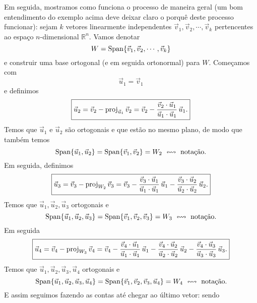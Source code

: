 \documentclass[../livro.tex]{subfiles}  %
\begin{document}
Em seguida, mostramos como funciona o processo de maneira geral (um bom entendimento do exemplo acima deve deixar claro o porquê deste processo funcionar): sejam $k$ vetores linearmente independentes $\vec{v}_1, \vec{v}_2, \cdots, \vec{v}_k$ pertencentes ao espaço $n$-dimensional $\mathbb{R}^n$. Vamos denotar
\begin{equation}
W = \operatorname{Span} \{\vec{v}_1, \vec{v}_2, \cdots, \vec{v}_k\}
\end{equation} e construir uma base ortogonal (e em seguida ortonormal) para $W$. Começamos com
\begin{equation}
\boxed{\vec{u}_1 = \vec{v}_1}
\end{equation} e definimos
\begin{equation}
\boxed{\vec{u}_2 = \vec{v}_2 - \operatorname{proj}_{\vec{u}_1} \vec{v}_2 = \vec{v}_2 - \frac{\vec{v}_2 \cdot \vec{u}_1}{\vec{u}_1 \cdot \vec{u}_1} \, \vec{u}_1.}
\end{equation} Temos que $\vec{u}_1$ e $\vec{u}_2$ são ortogonais e que estão no mesmo plano, de modo que também temos
\begin{equation}
\operatorname{Span} \{ \vec{u}_1, \vec{u}_2 \} = \operatorname{Span} \{ \vec{v}_1, \vec{v}_2 \} = W_2 \ \leftrightsquigarrow \text{ notação.}
\end{equation} Em seguida, definimos
\begin{equation}
\boxed{\vec{u}_3 = \vec{v}_3 - \operatorname{proj}_{W_2} \vec{v}_3 = \vec{v}_3 - \frac{\vec{v}_3 \cdot \vec{u}_1}{\vec{u}_1 \cdot \vec{u}_1} \, \vec{u}_1 - \frac{\vec{v}_3 \cdot \vec{u}_2}{\vec{u}_2 \cdot \vec{u}_2} \, \vec{u}_2.}
\end{equation} Temos que $\vec{u}_1, \vec{u}_2, \vec{u}_3$ ortogonais e
\begin{equation}
\Span \{ \vec{u}_1, \vec{u}_2, \vec{u}_3 \} = \Span \{ \vec{v}_1, \vec{v}_2, \vec{v}_3 \} = W_3 \ \leftrightsquigarrow \text{ notação.}
\end{equation} Em seguida
\begin{equation}
\boxed{\vec{u}_4 = \vec{v}_4 - \operatorname{proj}_{W_3} \vec{v}_4 = \vec{v}_4 - \frac{\vec{v}_4 \cdot \vec{u}_1}{\vec{u}_1 \cdot \vec{u}_1} \, \vec{u}_1 - \frac{\vec{v}_4 \cdot \vec{u}_2}{\vec{u}_2 \cdot \vec{u}_2} \, \vec{u}_2 - \frac{\vec{v}_4 \cdot \vec{u}_3}{\vec{u}_3 \cdot \vec{u}_3} \, \vec{u}_3.}
\end{equation} Temos que $\vec{u}_1, \vec{u}_2, \vec{u}_3, \vec{u}_4$ ortogonais e
\begin{equation}
\operatorname{Span} \{ \vec{u}_1, \vec{u}_2, \vec{u}_3, \vec{u}_4 \} = \operatorname{Span} \{ \vec{v}_1, \vec{v}_2, \vec{v}_3, \vec{u}_4 \} = W_4 \ \leftrightsquigarrow \text{ notação.}
\end{equation} E assim seguimos fazendo as contas até chegar ao último vetor: sendo
\end{document}
